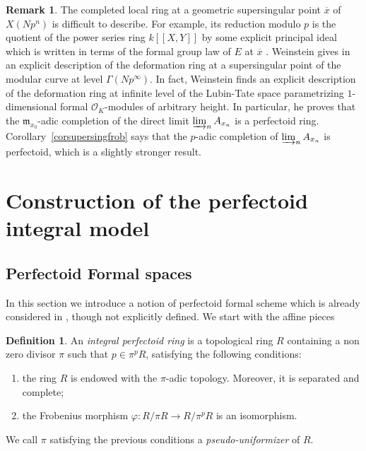 \documentclass[11pt]{article}
\newenvironment{enumeratei}
{\bgroup\def\theenumi{\roman{enumi}}\def\theenumii{\arabic{enumii}}\begin{enumerate}}
{\end{enumerate}\egroup}
\newcommand{\lcr}{[\![}
\newcommand{\rcr}{]\!]}
\numberwithin{equation}{section}
\theoremstyle{definition}
\newtheorem{definition}[prop]{Definition}
\newtheorem{remark}[prop]{Remark}
\newcommand{\n}[1]{\mathcal{#1}}
\newcommand{\f}[1]{\mathfrak{#1}}
\begin{document}
\begin{remark}
The completed local ring at a geometric supersingular point $\overline{x}$ of $X(Np^n)$ is difficult to describe. For example, its reduction modulo $p$ is the quotient of the power series ring $k\lcr X,Y\rcr$ by some explicit principal ideal which is written in terms of the formal group law of $E$ at $\overline{x}$ \cite[Th.\,13.8.4]{katz1985arithmetic}. Weinstein gives in \cite{MR3529120} an explicit description of the deformation ring at a supersingular point of the modular curve at level $\Gamma(Np^\infty)$. In fact, Weinstein finds an explicit description of the deformation ring at infinite level of the Lubin-Tate space parametrizing $1$\nobreakdash-dimensional formal $\n{O}_K$-modules of arbitrary height. In particular, he proves that the $\f{m}_{x_0}$-adic completion of the direct limit $\varinjlim_n A_{x_n}$ is a perfectoid ring. Corollary~\ref{corsupersingfrob} says that the $p$-adic completion of $\varinjlim_{n} A_{x_n}$ is perfectoid, which is a slightly stronger result.
\end{remark}

\section{Construction of the perfectoid integral model}
\label{Proof Theorem}

\subsection*{Perfectoid Formal spaces}

In this section we introduce a notion of perfectoid formal scheme which is already considered in \cite[Lem.\,3.10]{MR3905467}, though not explicitly defined. We start with the affine pieces

\begin{definition}
An \textit{integral perfectoid ring} is a topological ring $R$ containing a non zero divisor $\pi$ such that $p\in \pi^p R$, satisfying the following conditions:
\begin{enumeratei}

\item
the ring $R$ is endowed with the $\pi$-adic topology. Moreover, it is separated and complete;

\item
the Frobenius morphism $\varphi: R/\pi R\to R/\pi^{p}R$ is an isomorphism.
\end{enumeratei}
We call $\pi$ satisfying the previous conditions a \textit{pseudo-uniformizer} of $R$.
\end{definition}
\end{document}
